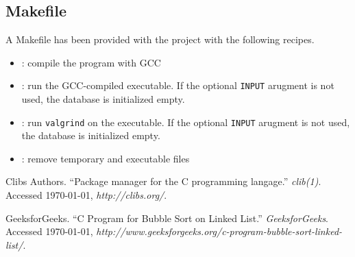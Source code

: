 \documentclass[usletter, 12pt]{article}
\begin{document}
        \subsection{Makefile} A Makefile has been provided with the project
        with the following recipes.
        \begin{itemize}

            \item {}: compile the program with GCC

            \item {}: run the GCC-compiled
            executable. If the optional \texttt{INPUT} arugment is not used,
            the database is initialized empty.

            \item {}: run \texttt{valgrind}
            on the executable. If the optional \texttt{INPUT} arugment is not
            used, the database is initialized empty.

            \item {}: remove temporary and executable files 

        \end{itemize}

    \begin{thebibliography}{9}
         Clibs Authors. ``Package manager for the C programming langage.'' \textit{clib(1)}. Accessed \today, \textit{http://clibs.org/}.

         GeeksforGeeks. ``C Program for Bubble Sort on Linked List.'' \textit{GeeksforGeeks}. Accessed \today, \textit{http://www.geeksforgeeks.org/c-program-bubble-sort-linked-list/}.
    \end{thebibliography}
\end{document}
